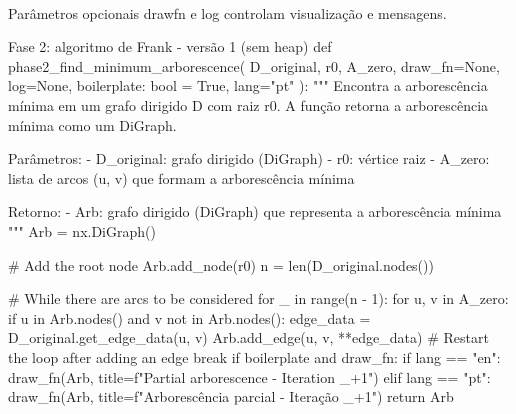 \documentclass[12pt,a4paper]{article}
\def\texttt#1{#1}%
\def\_{}%
\begin{document}
\paragraph{}
Parâmetros opcionais \texttt{draw\_fn} e \texttt{log} controlam visualização e mensagens.


\begin{pybox}{Fase 2: algoritmo de Frank - versão 1 (sem heap)}
def phase2_find_minimum_arborescence(
    D_original, r0, A_zero, draw_fn=None, log=None, boilerplate: bool = True, lang="pt"
):
    """
    Encontra a arborescência mínima em um grafo dirigido D com raiz r0.
    A função retorna a arborescência mínima como um DiGraph.

    Parâmetros:
        - D_original: grafo dirigido (DiGraph)
        - r0: vértice raiz
        - A_zero: lista de arcos (u, v) que formam a arborescência mínima

    Retorno:
        - Arb: grafo dirigido (DiGraph) que representa a arborescência mínima
    """
    Arb = nx.DiGraph()

    # Add the root node
    Arb.add_node(r0)
    n = len(D_original.nodes())

    # While there are arcs to be considered
    for _ in range(n - 1):
        for u, v in A_zero:
            if u in Arb.nodes() and v not in Arb.nodes():
                edge_data = D_original.get_edge_data(u, v)
                Arb.add_edge(u, v, **edge_data)
                # Restart the loop after adding an edge
                break
        if boilerplate and draw_fn:
            if lang == "en":
                draw_fn(Arb, title=f"Partial arborescence - Iteration {_+1}")
            elif lang == "pt":
                draw_fn(Arb, title=f"Arborescência parcial - Iteração {_+1}")
    return Arb
\end{pybox}
\end{document}
